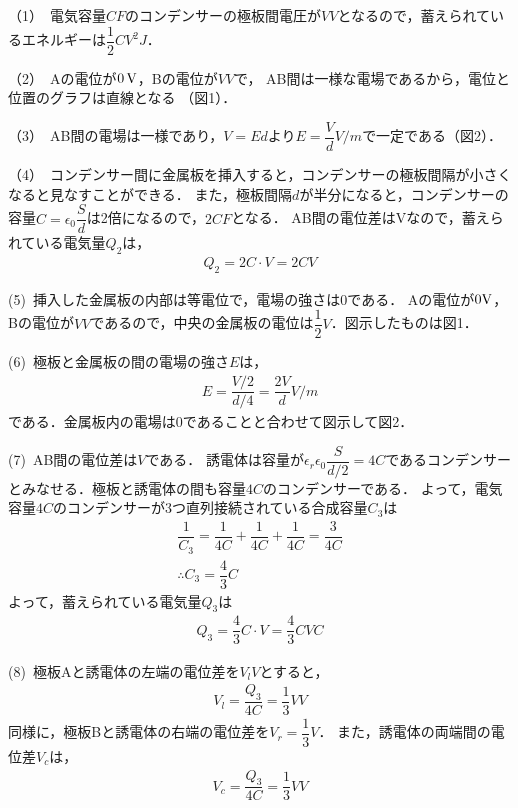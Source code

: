 \setcounter{eqNo}{0}
\setcounter{figure}{0}
\noindent （1）\,
電気容量$C\unit{F}$のコンデンサーの極板間電圧が$V\unit{V}$となるので，蓄えられているエネルギーは$\dfrac{1}{2}CV^2\unit{J}$．

\noindent （2）\,
Aの電位が$0\,\textup{V}$，Bの電位が$V\unit{V}$で，
AB間は一様な電場であるから，電位と位置のグラフは直線となる
（図1）．

\noindent （3）\,
AB間の電場は一様であり，$V=Ed$より$E=\dfrac{V}{d}\unit{V/m}$で一定である（図2）．

\noindent （4）\,
コンデンサー間に金属板を挿入すると，コンデンサーの極板間隔が小さくなると見なすことができる．
また，極板間隔$d$が半分になると，コンデンサーの容量$C=\epsilon_0 \dfrac{S}{d}$は2倍になるので，$2C\unit{F}$となる．
AB間の電位差はVなので，蓄えられている電気量$Q_2$は，
\begin{align*}
  Q_2 = 2C\cdot V = 2CV
\end{align*}

\noindent (5)\, 
挿入した金属板の内部は等電位で，電場の強さは0である．
Aの電位が$0\textup{V}$，Bの電位が$V\unit{V}$であるので，中央の金属板の電位は$\dfrac{1}{2}\unit{V}$．図示したものは図1．

\noindent (6)\,
極板と金属板の間の電場の強さ$E$は，
\begin{align*}
  E = \dfrac{V/2}{d/4} = \dfrac{2V}{d} \unit{V/m}
\end{align*}
である．金属板内の電場は0であることと合わせて図示して図2．

\noindent (7)\, 
AB間の電位差は$V$である．
誘電体は容量が$\epsilon_r\epsilon_0\dfrac{S}{d/2}=4C$であるコンデンサーとみなせる．極板と誘電体の間も容量$4C$のコンデンサーである．
よって，電気容量$4C$のコンデンサーが3つ直列接続されている合成容量$C_3$は
\begin{align*}
  \dfrac{1}{C_3} = \dfrac{1}{4C} + \dfrac{1}{4C} + \dfrac{1}{4C} = \dfrac{3}{4C}\\
  \therefore C_3 = \dfrac{4}{3}C
\end{align*}
よって，蓄えられている電気量$Q_3$は
\begin{align*}
  Q_3 = \dfrac{4}{3}C\cdot V = \dfrac{4}{3}CV\unit{C}
\end{align*}

\noindent (8)\, 
極板Aと誘電体の左端の電位差を$V_l\unit{V}$とすると，
\begin{align*}
  V_l = \dfrac{Q_3}{4C} = \dfrac{1}{3}V\unit{V}
\end{align*}
同様に，極板Bと誘電体の右端の電位差を$V_r=\dfrac{1}{3}\unit{V}$．
また，誘電体の両端間の電位差$V_c$は，
\begin{align*}
  V_c = \dfrac{Q_3}{4C} = \dfrac{1}{3}V\unit{V}
\end{align*}

